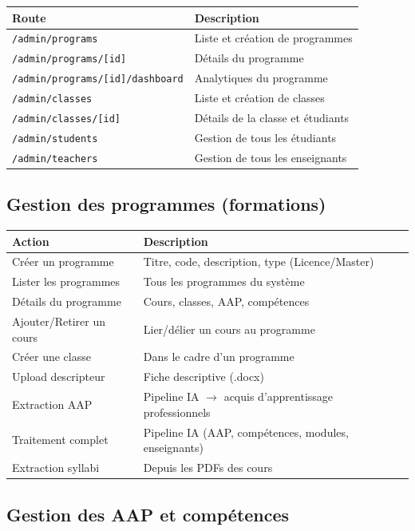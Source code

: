 \documentclass[12pt,a4paper]{article}
\begin{document}
\begin{longtable}{@{}p{6.5cm}p{8cm}@{}}
\toprule
\textbf{Route} & \textbf{Description} \\
\midrule
\endhead
\texttt{/admin/programs} & Liste et création de programmes \\
\texttt{/admin/programs/[id]} & Détails du programme \\
\texttt{/admin/programs/[id]/dashboard} & Analytiques du programme \\
\texttt{/admin/classes} & Liste et création de classes \\
\texttt{/admin/classes/[id]} & Détails de la classe et étudiants \\
\texttt{/admin/students} & Gestion de tous les étudiants \\
\texttt{/admin/teachers} & Gestion de tous les enseignants \\
\bottomrule
\end{longtable}

\subsection{Gestion des programmes (formations)}

\begin{longtable}{@{}p{4.5cm}p{10cm}@{}}
\toprule
\textbf{Action} & \textbf{Description} \\
\midrule
\endhead
Créer un programme & Titre, code, description, type (Licence/Master) \\
Lister les programmes & Tous les programmes du système \\
Détails du programme & Cours, classes, AAP, compétences \\
Ajouter/Retirer un cours & Lier/délier un cours au programme \\
Créer une classe & Dans le cadre d'un programme \\
Upload descripteur & Fiche descriptive (.docx) \\
Extraction AAP & Pipeline IA $\rightarrow$ acquis d'apprentissage professionnels \\
Traitement complet & Pipeline IA (AAP, compétences, modules, enseignants) \\
Extraction syllabi & Depuis les PDFs des cours \\
\bottomrule
\end{longtable}

\subsection{Gestion des AAP et compétences}
\end{document}
